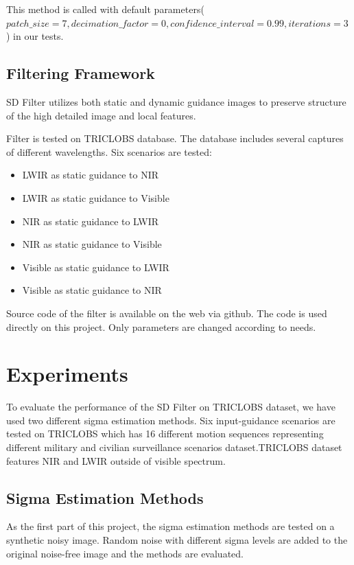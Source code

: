\documentclass[10pt,twocolumn,letterpaper]{article}
\begin{document}
This method is called with default parameters(\(patch\_size=7, decimation\_factor=0, confidence\_interval=0.99, iterations=3\)) in our tests.
\subsection{Filtering Framework}\label{ss:filter-framework}
SD Filter\cite{ham2015robust} utilizes both static and dynamic guidance images to preserve structure of the high detailed image and local features.

Filter is tested on TRICLOBS\cite{triclobs} database. The database includes several captures of different wavelengths. Six scenarios are tested:
\begin{itemize}
	\item LWIR as static guidance to NIR
	\item LWIR as static guidance to Visible
	\item NIR as static guidance to LWIR
	\item NIR as static guidance to Visible
	\item Visible as static guidance to LWIR
	\item Visible as static guidance to NIR
\end{itemize}

Source code of the filter is available on the web via github\cite{github:sdfilter}. The code is used directly on this project. Only parameters are changed according to needs.

\section{Experiments}

To evaluate the performance of the SD Filter\cite{ham2015robust} on TRICLOBS\cite{triclobs} dataset, we have used two different sigma estimation methods. Six input-guidance scenarios are tested on TRICLOBS which has  16 different motion sequences representing different military and civilian surveillance scenarios dataset.TRICLOBS dataset features NIR and LWIR outside of visible spectrum. 

\subsection{Sigma Estimation Methods}
As the first part of this project, the sigma estimation methods are tested on a synthetic noisy image. Random noise with different sigma levels are added to the original noise-free image and the methods are evaluated.
\end{document}
